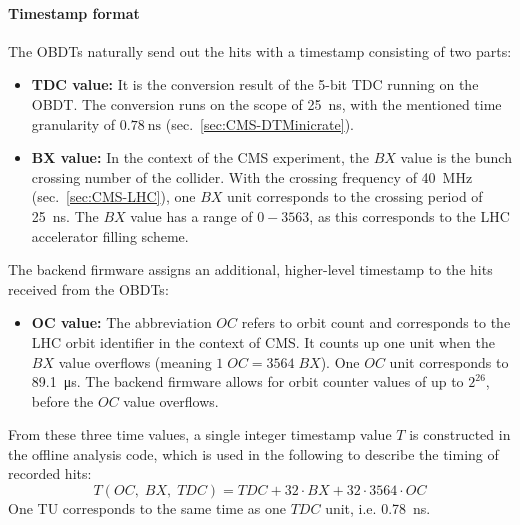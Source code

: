\paragraph{Timestamp format}
The \acp{OBDT} naturally send out the hits with a timestamp consisting of two parts:
\begin{itemize}
\item \textbf{TDC value:} It is the conversion result of the 5-bit \ac{TDC} running on the \ac{OBDT}. The conversion runs on the scope of \SI{25}{\nano\second}, with the mentioned time granularity of $\SI{0.78}{\nano\second}$ (sec.\ \ref{sec:CMS-DTMinicrate}).
\item \textbf{BX value:} In the context of the \ac{CMS} experiment, the $BX$ value is the bunch crossing number of the collider. With the crossing frequency of \SI{40}{\mega\hertz} (sec.\ \ref{sec:CMS-LHC}), one $BX$ unit corresponds to the crossing period of \SI{25}{\nano\second}. The $BX$ value has a range of $0-3563$, as this corresponds to the \ac{LHC} accelerator filling scheme.
\end{itemize}
The backend firmware assigns an additional, higher-level timestamp to the hits received from the \acp{OBDT}:
\begin{itemize}
\item \textbf{OC value:} The abbreviation $OC$ refers to orbit count and corresponds to the \ac{LHC} orbit identifier in the context of \ac{CMS}. It counts up one unit when the $BX$ value overflows (meaning $1\; OC=3564\; BX$). One $OC$ unit corresponds to \SI{89.1}{\micro\second}. The backend firmware allows for orbit counter values of up to $2^{26}$, before the $OC$ value overflows.
\end{itemize}
From these three time values, a single integer timestamp value $T$ is constructed in the offline analysis code, which is used in the following to describe the timing of recorded hits:
\begin{equation}
T(OC,\;BX,\;TDC) = TDC + 32\cdot BX +  32\cdot 3564\cdot OC
\label{eq:Timestamp}
\end{equation}
One \ac{TU} corresponds to the same time as one $TDC$ unit, i.e. \SI{0.78}{\nano\second}.



